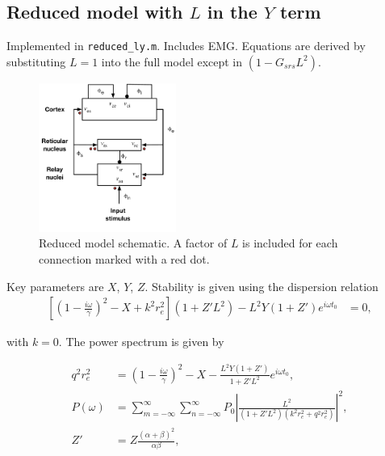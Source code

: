 \documentclass[10pt,a4paper]{article}
\begin{document}
\subsection{Reduced model with $L$ in the $Y$ term}
Implemented in {\tt reduced\_ly.m}. Includes EMG. Equations are derived by substituting $L = 1$ into the full model except in $(1-G_{srs}L^2)$. 

\begin{figure}[h!]
\begin{center}
\includegraphics[width=0.4\textwidth]{reduced_ly}
\caption{Reduced model schematic. A factor of $L$ is included for each connection marked with a red dot.}
\label{fig:full}
\end{center}
\end{figure}

Key parameters are $X$, $Y$, $Z$. Stability is given using the dispersion relation
\begin{align}
	\left[ \left(1-\frac{i\omega}{\gamma}\right)^2 - X + k^2r_e^2 \right] \left( 1+Z' L^2 \right) - L^2Y\left( 1+Z' \right) e^{i\omega t_0} &= 0, %
\end{align}

with $k=0$. The power spectrum is given by

\begin{align}
	q^2r_e^2 &= \left( 1 - \frac{i \omega}{\gamma}\right)^2  - X - \frac{L^2Y(1+Z')}{1+Z'L^2}e^{i\omega t_0},\\[14pt]
	P(\omega) &= \sum_{m = -\infty}^{\infty}\sum_{n = -\infty}^{\infty} P_0 \left| \frac{L^2}{(1+Z'L^2)(k^2r_e^2+q^2r_e^2)}\right|^2,\\[14pt]
	Z' &= Z \frac{(\alpha+\beta)^2}{\alpha\beta},
\end{align}
\end{document}
